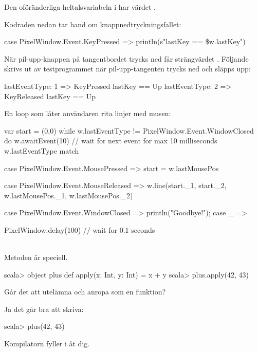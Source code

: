 \SubtaskSolved Den oföränderliga heltalsvariabeln  i  har värdet .

\SubtaskSolved Kodraden nedan tar hand om knappnedtryckningsfallet:
\begin{Code}
case PixelWindow.Event.KeyPressed => println(s"lastKey == \$w.lastKey")
\end{Code}

\SubtaskSolved När pil-upp-knappen på tangentbordet trycks ned får  strängvärdet . Följande skrivs ut av testprogrammet när pil-upp-tangenten trycks ned och släpps upp:
\begin{REPL}
lastEventType: 1 => KeyPressed
lastKey == Up
lastEventType: 2 => KeyReleased
lastKey == Up
\end{REPL}


\SubtaskSolved En loop som låter användaren rita linjer med musen:
\begin{Code}
var start = (0,0)
while w.lastEventType != PixelWindow.Event.WindowClosed do
  w.awaitEvent(10)  // wait for next event for max 10 milliseconds
  w.lastEventType match {
    case PixelWindow.Event.MousePressed  =>
      start = w.lastMousePos

    case PixelWindow.Event.MouseReleased =>
      w.line(start._1, start._2, w.lastMousePos._1, w.lastMousePos._2)

    case PixelWindow.Event.WindowClosed  =>
       println("Goodbye!");
    case _ =>
  }
  PixelWindow.delay(100) // wait for 0.1 seconds
\end{Code}

\QUESTEND


\clearpage

\ExtraTasks %


\QUESTBEGIN

\Task  \what~ \\
Metoden  är speciell.
\begin{REPL}
scala> object plus { def apply(x: Int, y: Int) = x + y }
scala> plus.apply(42, 43)
\end{REPL}
Går det att utelämna  och anropa  som en funktion?

\SOLUTION

\TaskSolved \what
Ja det går bra att skriva:
\begin{REPL}
scala> plus(42, 43)
\end{REPL}
Kompilatorn fyller i  åt dig.
\QUESTEND


